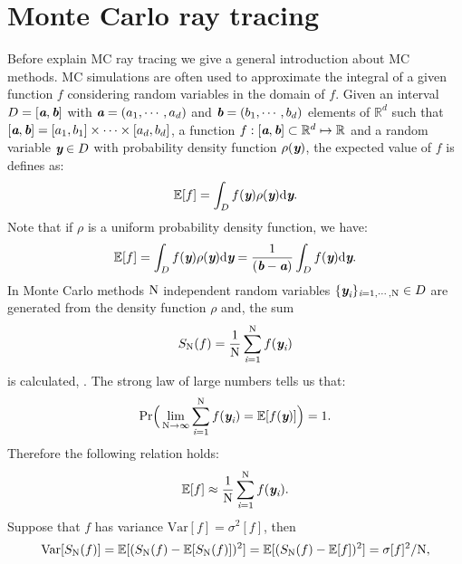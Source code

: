 \section{Monte Carlo ray tracing}
Before explain MC ray tracing we give a general introduction about MC methods. MC simulations are often used to approximate the integral of a given function $f$ considering random variables in the domain of $f$. Given an interval $D = [\textit{\textbf{a}}, \textit{\textbf{b}}]$ with $\textit{\textbf{a}} = (a_1, \cdots, a_d)$ and $\textit{\textbf{b}} = (b_1, \cdots, b_d)$ elements of $\mathbb{R}^d$ such that
$[\textit{\textbf{a}}, \textit{\textbf{b}}]  = [a_1, b_1] \times \cdots \times [a_d, b_d]$, a function $f:[\textit{\textbf{a}},\textit{\textbf{b}}]\subset \mathbb{R}^d \mapsto \mathbb{R}$ and a random variable 
$\textit{\textbf{y}}\in D$ with probability density function $\rho(\textit{\textbf{y}})$, the expected value of $f$ is defines as:
\begin{equation}
\mathbb{E}[f] =\int_{D}f(\textit{\textbf{y}})\rho(\textit{\textbf{y}}) \textrm{d}\textit{\textbf{y}}.
\end{equation}
Note that if $\rho$ is a uniform probability density function, we have:
\begin{equation}
\mathbb{E}[f] = \int_{D}f(\textit{\textbf{y}})\rho(\textit{\textbf{y}}) \textrm{d}\textit{\textbf{y}} =\frac{1}{(\textit{\textbf{b}}-\textit{\textbf{a}})} \int_{D}f(\textit{\textbf{y}}) \textrm{d}\textit{\textbf{y}}.
\end{equation}
In Monte Carlo methods $\textrm{N}$ independent random variables  $\{\textit{\textbf{y}}_{\textit{i}}\}_{\textit{i} = 1, \cdots, \textrm{N}}\in D$ are generated from the density function  $\rho$ and, the sum
\begin{equation}
S_{\textrm{N}}(f) = \frac{1}{\textrm{N}} \sum_{\textit{i}=1}^{\textrm{N}} f(\textit{\textbf{y}}_{\textit{i}})
\end{equation}
is calculated,  \cite{owen2003quasi}.
The strong law of large numbers tells us that:
\begin{equation}
\textrm{Pr}\Big(\lim_{\textrm{N}\rightarrow\infty}\sum_{\textit{i}=1}^{\textrm{N}} f(\textit{\textbf{y}}_{\textit{i}}) = \mathbb{E}[f(\textit{\textbf{y}})] \Big) = 1.
\end{equation}
Therefore the following relation holds:
\begin{equation}
\mathbb{E}[f] \approx \frac{1}{\textrm{N}} \sum_{\textit{i}=1}^{\textrm{N}} f(\textit{\textbf{y}}_{\textit{i}}).
\end{equation}
Suppose that $f$ has variance $\textrm{Var}[f]=\sigma^2[f] $, then
\begin{equation}
\textrm{Var}[S_{\textrm{N}}(f)] = \mathbb{E}[(S_{\textrm{N}}(f)-\mathbb{E}[S_{\textrm{N}}(f)])^2]= \mathbb{E}[(S_{\textrm{N}}(f)-\mathbb{E}[f])^2] = \sigma[f]^2/\textrm{N},
\end{equation}
